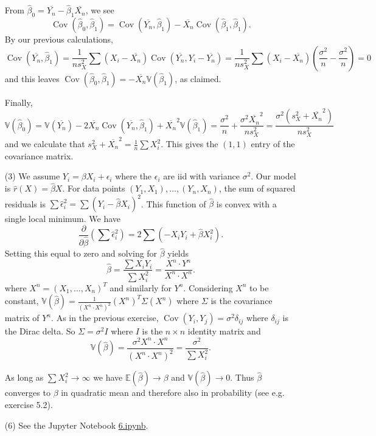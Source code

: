 \documentclass[10pt]{article}
\newcommand{\V}{\mathbb{V}}
\newcommand{\E}{\mathbb{E}}
\newcommand{\Cov}{\operatorname{Cov}}
\begin{document}
\begin{enumerate}
From $\hat \beta_0 = \overline{Y_n} - \hat \beta_1 \overline{X_n}$, we see
\[
\Cov(\hat \beta_0, \hat \beta_1) = \Cov(\overline{Y_n},\hat \beta_1) -
\overline{X_n} \Cov(\hat \beta_1, \hat \beta_1).
\]
By our previous calculations,
\[
\Cov(\overline{Y_n},\hat\beta_1) = \frac{1}{n s_X^2} \sum (X_i-\overline{X_n})
\Cov(\overline{Y_n}, Y_i-\overline{Y_n}) = \frac{1}{n s_X^2}
\sum (X_i - \overline{X_n})\left(\frac{\sigma^2}{n} - \frac{\sigma^2}{n}\right)
= 0
\]
and this leaves $\Cov(\hat \beta_0, \hat \beta_1) = -\overline{X_n} \V(\hat \beta_1)$,
as claimed.

Finally,
\[
\V(\hat \beta_0) = \V(\overline{Y_n}) -
2 \overline{X_n} \Cov(\overline{Y_n}, \hat \beta_1) + \overline{X_n}^2\V(\hat \beta_1)
= \frac{\sigma^2}{n} + \frac{\sigma^2 \overline{X_n}^2}{ns_X^2} =
\frac{\sigma^2(s_X^2 + \overline{X_n}^2)}{ns_X^2}
\]
and we calculate that $s_X^2+\overline{X_n}^2=\frac{1}{n}\sum X_i^2$.
This gives the $(1,1)$ entry of the covariance matrix.

\item[(3)]
We assume $Y_i = \beta X_i + \epsilon_i$ where the $\epsilon_i$ are iid with
variance $\sigma^2$.
Our model is $\hat r(X)=\hat \beta X$. For data points $(Y_1,X_1), \ldots, (Y_n,X_n)$,
the sum of squared residuals is
$\sum \hat \epsilon_i^2 = \sum (Y_i - \hat \beta X_i)^2$. This function of $\hat \beta$
is convex with a single local minimum. We have
\[
\frac{\partial}{\partial \hat\beta} \left(\sum \hat \epsilon_i^2\right) =
2 \sum \left(-X_iY_i + \hat \beta X_i^2\right).
\]
Setting this equal to zero and solving for $\hat\beta$ yields
\[
\hat\beta = \frac{\sum X_iY_i}{\sum X_i^2} = \frac{X^n \cdot Y^n}
{X^n \cdot X^n}.
\]
where $X^n = (X_1,\ldots,X_n)^T$ and similarly for $Y^n$. Considering
$X^n$ to be constant, $\V(\hat \beta) =
\frac{1}{(X^n \cdot X^n)^2} (X^n)^T \Sigma (X^n)$ where $\Sigma$ is the covariance
matrix of $Y^n$. As in the previous exercise, $\Cov(Y_i,Y_j)=\sigma^2 \delta_{ij}$
where $\delta_{ij}$ is the Dirac delta. So $\Sigma=\sigma^2 I$ where $I$ is the
$n\times n$ identity matrix and
\[
\V(\hat\beta) = \frac{\sigma^2 X^n \cdot X^n}{(X^n \cdot X^n)^2}
= \frac{\sigma^2}{\sum X_i^2}.
\]

As long as $\sum X_i^2 \to \infty$ we have $\E(\hat \beta)\to \beta$ and
$\V(\hat \beta)\to 0$. Thus $\hat \beta$ converges to $\beta$ in quadratic mean
and therefore also in probability (see e.g. exercise 5.2).

\item[(6)]
See the Jupyter Notebook
\href{https://github.com/ajrasmus/some_of_statistics/blob/main/chapter_13/6.ipynb}{6.ipynb}.


\end{enumerate}
\end{document}
